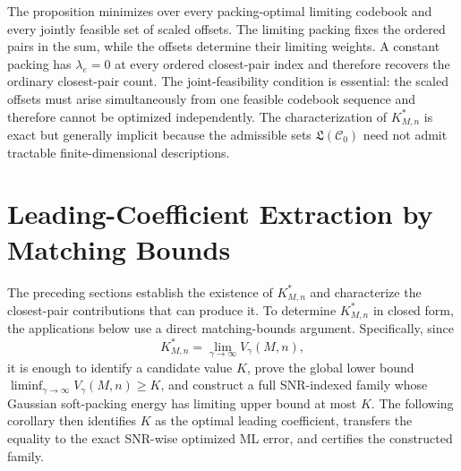 \documentclass[12pt,draftclsnofoot,onecolumn]{IEEEtran}
\newcommand{\cC}{\mathcal{C}}
\theoremstyle{definition}
\begin{document}
The proposition minimizes over every packing-optimal limiting codebook and
every jointly feasible set of scaled offsets.  The limiting packing fixes
the ordered pairs in the sum, while the offsets determine their limiting
weights.  A constant packing has \(\lambda_e=0\) at every ordered
closest-pair index and therefore recovers the ordinary closest-pair count.
The joint-feasibility condition is essential: the scaled offsets must
arise simultaneously from one feasible codebook sequence and therefore
cannot be optimized independently.  The characterization of
\(K^{\ast}_{M,n}\) is exact but generally implicit because the admissible
sets \(\mathfrak L(\cC_0)\) need not admit tractable finite-dimensional
descriptions.

 

\section{Leading-Coefficient Extraction by Matching Bounds}
\label{sec:optimization-attainment-extraction}

The preceding sections establish the existence of \(K^{\ast}_{M,n}\)
and characterize the closest-pair contributions that can produce it.  To
determine \(K^{\ast}_{M,n}\) in closed form, the applications below use a
direct matching-bounds argument.  Specifically, since
\begin{equation*}
  K^{\ast}_{M,n}=\lim_{\gamma\to\infty}V_\gamma(M,n),
\end{equation*}
it is enough to identify a candidate value \(K\), prove the global lower
bound \(\liminf_{\gamma\to\infty}V_\gamma(M,n)\geq K\), and construct a
full SNR-indexed family whose Gaussian soft-packing energy has limiting
upper bound at most \(K\).  The following corollary then identifies \(K\)
as the optimal leading coefficient, transfers the equality to the exact
SNR-wise optimized ML error, and certifies the constructed family.
\end{document}
